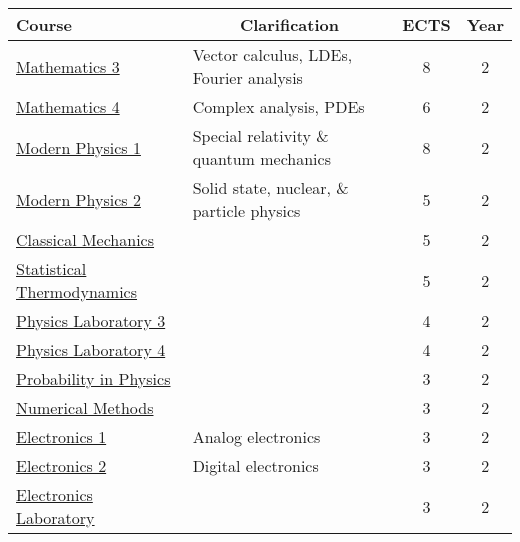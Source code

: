 \documentclass[11pt, a4paper]{article}
\begin{document}
\begin{table}[htb!]
\begin{tabular}{|l|l|c|c|}
    \hline {\rule{0pt}{2.0ex}} \hspace{-7pt}
    \textbf{Course} & \multicolumn{1}{c}{\textbf{Clarification}} & \textbf{ECTS} & \textbf{Year}\\
    \hline
    \hline {\rule{0pt}{2.5ex}} \hspace{-7pt}
    \hyperref[mathematics-3]{Mathematics 3} & Vector calculus, LDEs, Fourier analysis & 8 & 2\\
    \hyperref[mathematics-4]{Mathematics 4} & Complex analysis, PDEs & 6 & 2\\
    \hyperref[modern-physics-1]{Modern Physics 1} & Special relativity \& quantum mechanics & 8 & 2\\
    \hyperref[modern-physics-2]{Modern Physics 2} & Solid state, nuclear, \& particle physics & 5 & 2\\
    \hyperref[classical-mechanics]{Classical Mechanics} & & 5 & 2\\
    \hyperref[statistical-thermodynamics]{Statistical Thermodynamics} & & 5 & 2\\
    \hyperref[physics-laboratory-3]{Physics Laboratory 3} & & 4 & 2\\
    \hyperref[physics-laboratory-4]{Physics Laboratory 4} & & 4 & 2\\
    \hyperref[probability-in-physics]{Probability in Physics} & & 3 & 2\\
    \hyperref[numerical-methods]{Numerical Methods} & & 3 & 2\\
    \hyperref[electronics-1]{Electronics 1} & Analog electronics & 3 & 2\\
    \hyperref[electronics-2]{Electronics 2} & Digital electronics & 3 & 2\\
    \hyperref[electronics-laboratory]{Electronics Laboratory} & & 3 & 2\\
    \hline
    \hline


\end{tabular}
\end{table}
\end{document}
